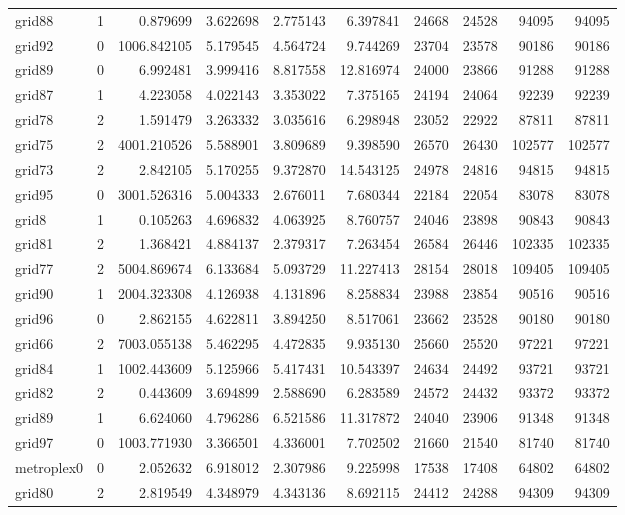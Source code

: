 \begin{longtable}{|l|r|r|r|r|r|r|r|r|r|}
grid88 & 1 & 0.879699 & 3.622698 & 2.775143 & 6.397841 & 24668 & 24528 & 94095 & 94095 \\
grid92 & 0 & 1006.842105 & 5.179545 & 4.564724 & 9.744269 & 23704 & 23578 & 90186 & 90186 \\
grid89 & 0 & 6.992481 & 3.999416 & 8.817558 & 12.816974 & 24000 & 23866 & 91288 & 91288 \\
grid87 & 1 & 4.223058 & 4.022143 & 3.353022 & 7.375165 & 24194 & 24064 & 92239 & 92239 \\
grid78 & 2 & 1.591479 & 3.263332 & 3.035616 & 6.298948 & 23052 & 22922 & 87811 & 87811 \\
grid75 & 2 & 4001.210526 & 5.588901 & 3.809689 & 9.398590 & 26570 & 26430 & 102577 & 102577 \\
grid73 & 2 & 2.842105 & 5.170255 & 9.372870 & 14.543125 & 24978 & 24816 & 94815 & 94815 \\
grid95 & 0 & 3001.526316 & 5.004333 & 2.676011 & 7.680344 & 22184 & 22054 & 83078 & 83078 \\
grid8 & 1 & 0.105263 & 4.696832 & 4.063925 & 8.760757 & 24046 & 23898 & 90843 & 90843 \\
grid81 & 2 & 1.368421 & 4.884137 & 2.379317 & 7.263454 & 26584 & 26446 & 102335 & 102335 \\
grid77 & 2 & 5004.869674 & 6.133684 & 5.093729 & 11.227413 & 28154 & 28018 & 109405 & 109405 \\
grid90 & 1 & 2004.323308 & 4.126938 & 4.131896 & 8.258834 & 23988 & 23854 & 90516 & 90516 \\
grid96 & 0 & 2.862155 & 4.622811 & 3.894250 & 8.517061 & 23662 & 23528 & 90180 & 90180 \\
grid66 & 2 & 7003.055138 & 5.462295 & 4.472835 & 9.935130 & 25660 & 25520 & 97221 & 97221 \\
grid84 & 1 & 1002.443609 & 5.125966 & 5.417431 & 10.543397 & 24634 & 24492 & 93721 & 93721 \\
grid82 & 2 & 0.443609 & 3.694899 & 2.588690 & 6.283589 & 24572 & 24432 & 93372 & 93372 \\
grid89 & 1 & 6.624060 & 4.796286 & 6.521586 & 11.317872 & 24040 & 23906 & 91348 & 91348 \\
grid97 & 0 & 1003.771930 & 3.366501 & 4.336001 & 7.702502 & 21660 & 21540 & 81740 & 81740 \\
metroplex0 & 0 & 2.052632 & 6.918012 & 2.307986 & 9.225998 & 17538 & 17408 & 64802 & 64802 \\
grid80 & 2 & 2.819549 & 4.348979 & 4.343136 & 8.692115 & 24412 & 24288 & 94309 & 94309 \\

\end{longtable}

